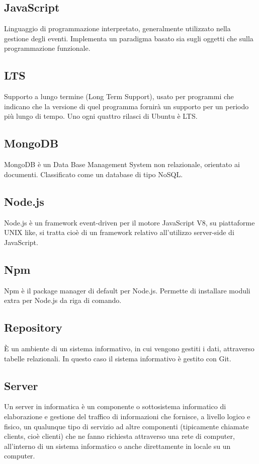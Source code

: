 \documentclass[a4paper, titlepage]{article}
\begin{document}
	\subsection{JavaScript}
	Linguaggio di programmazione interpretato, generalmente utilizzato nella gestione degli eventi.
	Implementa un paradigma basato sia sugli oggetti che sulla programmazione funzionale.
	
	\subsection{LTS}
	 Supporto a lungo termine (Long Term Support), usato per programmi che indicano che la versione di quel programma fornirà un supporto per un periodo più lungo di tempo. Uno ogni quattro rilasci di Ubuntu è LTS.
	
	\subsection{MongoDB}
	MongoDB è un Data Base Management System non relazionale, orientato ai documenti. Classificato come un database di tipo NoSQL.
	
	\subsection{Node.js}
	Node.js è un framework event-driven per il motore JavaScript V8, su piattaforme UNIX like, si tratta cioè di un framework relativo all'utilizzo server-side di JavaScript.
	
	\subsection{Npm}
	Npm è il package manager di default per Node.js. Permette di installare moduli extra per Node.js da riga di comando.
	
	\subsection{Repository}
	È un ambiente di un sistema informativo, in cui vengono gestiti i dati, attraverso tabelle relazionali. In questo caso il sistema informativo è gestito con Git.
	
	\subsection{Server}
	Un server in informatica è un componente o sottosistema informatico di elaborazione e gestione del traffico di informazioni che fornisce, a livello logico e fisico, un qualunque tipo di servizio ad altre componenti (tipicamente chiamate clients, cioè clienti) che ne fanno richiesta attraverso una rete di computer, all'interno di un sistema informatico o anche direttamente in locale su un computer.
	
\end{document}
